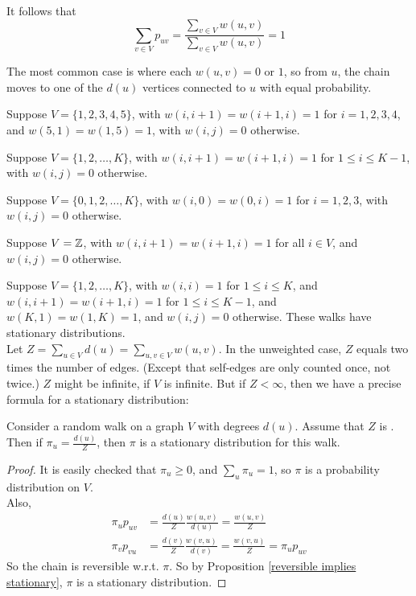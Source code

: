 \documentclass[11pt]{article}
\begin{document}
    \remark
    It follows that 
    $$\sum_{v \in V} p_{uv} = \frac{\sum_{v \in V}w(u, v)}{\sum_{v \in V}w(u,v)} = 1$$
    
    \remark
    The most common case is where each $w(u,v) = 0$ or $1$, so from $u$, the chain moves to one of the $d(u)$ vertices connected to $u$ with equal probability.
    
    Suppose $V = \{1,2,3,4,5\}$, with $w(i, i+1) = w(i+1, i) = 1$ for $i = 1, 2, 3, 4$, and $w(5,1) = w(1,5) = 1$, with $w(i,j) = 0$ otherwise.
    
    Suppose $V = \{1,2,\hdots,K\}$, with $w(i, i+1) = w(i+1, i) = 1$ for $1 \leq i \leq K-1$, with $w(i,j) = 0$ otherwise.
    
    Suppose $V = \{0, 1, 2, \hdots, K\}$, with $w(i, 0) = w(0,i) = 1$ for $i = 1,2,3$, with $w(i,j) = 0$ otherwise.
    
    Suppose $V = \mathbb{Z}$, with $w(i, i+1) = w(i+1, i) = 1$ for all $i \in V$, and $w(i, j) = 0$ otherwise. 
    
     Suppose $V = \{1,2,\hdots,K\}$, with $w(i,i) = 1$ for $1 \leq i \leq K$, and $w(i, i+1) = w(i+1, i) = 1$ for $1 \leq i \leq K - 1$, and $w(K, 1) = w(1,K) = 1$, and $w(i,j) = 0$ otherwise.
    \remark
    These walks have stationary distributions. \\
    Let $Z = \sum_{u\in V} d(u) = \sum_{u, v \in V} w(u,v)$. In the unweighted case, $Z$ equals two times the number of edges. (Except that self-edges are only counted once, not twice.) $Z$ might be infinite, if $V$ is infinite. But if $Z < \infty$, then we have a precise formula for a stationary distribution:
    
    Consider a random walk on a graph $V$ with degrees $d(u)$. Assume that $Z$ is . Then if $\pi_u = \frac{d(u)}{Z}$, then $\pi$ is a stationary distribution for this walk. 
    \begin{proof}
    	It is easily checked that $\pi_u \geq 0$, and $\sum_u \pi_u = 1$, so $\pi$ is a probability distribution on $V$.\\
    	Also, 
    	\begin{align*}
    		\pi_u p_{uv} &= \frac{d(u)}{Z} \frac{w(u,v)}{d(u)} = \frac{w(u,v)}{Z} \\
    		\pi_v p_{vu} &= \frac{d(v)}{Z} \frac{w(v,u)}{d(v)} = \frac{w(v,u)}{Z} = \pi_u p_{uv}
    	\end{align*}
    	So the chain is reversible w.r.t. $\pi$. So by Proposition \ref{reversible implies stationary}, $\pi$ is a stationary distribution.
    \end{proof}
    
\end{document}
